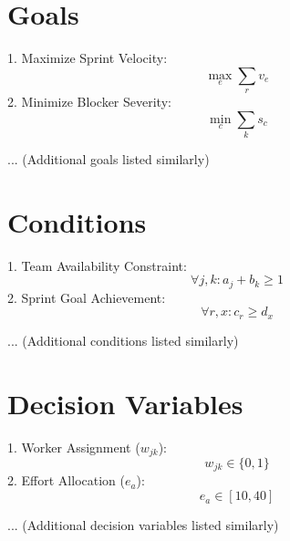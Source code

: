 \documentclass{article}
\begin{document}
\section{Goals}
1. Maximize Sprint Velocity:
   \[
   \max_{e} \sum_{r} v_e
   \]
2. Minimize Blocker Severity:
   \[
   \min_{c} \sum_{k} s_c
   \]

... (Additional goals listed similarly)

\section{Conditions}
1. Team Availability Constraint:
   \[
   \forall j, k: a_j + b_k \geq 1
   \]
2. Sprint Goal Achievement:
   \[
   \forall r, x: c_r \geq d_x
   \]

... (Additional conditions listed similarly)

\section{Decision Variables}
1. Worker Assignment (\( w_{jk} \)):
   \[
   w_{jk} \in \{0, 1\}
   \]
2. Effort Allocation (\( e_a \)):
   \[
   e_a \in [10, 40]
   \]

... (Additional decision variables listed similarly)
\end{document}
